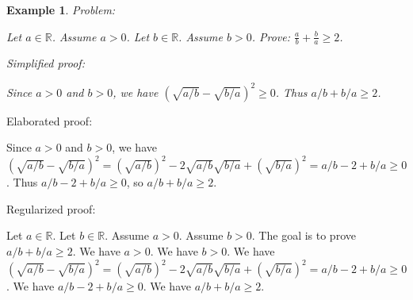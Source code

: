 \documentclass{article}
\newtheorem{example}{Example}
\begin{document}
\begin{tcolorbox}[colback=white!10, width=\linewidth]
\begin{lstlisting}[language=Lean4]
\end{lstlisting}
\end{tcolorbox}


\begin{example}
Problem:
\begin{tcolorbox}[colback=yellow!10, width=\linewidth]
Let $a\in\mathbb{R}$. Assume $a > 0$.
    Let $b\in\mathbb{R}$. Assume $b > 0$.
    Prove: $\frac{a}{b} + \frac{b}{a} \ge 2$.
\end{tcolorbox}

Simplified proof:
\begin{tcolorbox}[colback=blue!10, width=\linewidth]
Since $a>0$ and $b>0$, we have $(\sqrt{a/b} - \sqrt{b/a})^2 \ge 0$. Thus $a/b + b/a \ge 2$.
\end{tcolorbox}
\end{example}

Elaborated proof:
\begin{tcolorbox}[colback=green!10, width=\linewidth]
Since $a>0$ and $b>0$, we have $(\sqrt{a/b} - \sqrt{b/a})^2 = (\sqrt{a/b})^2 - 2\sqrt{a/b}\sqrt{b/a} + (\sqrt{b/a})^2 = a/b - 2 + b/a \ge 0$. Thus $a/b - 2 + b/a \ge 0$, so $a/b + b/a \ge 2$.
\end{tcolorbox}

Regularized proof:
\begin{tcolorbox}[colback=red!10, width=\linewidth]
Let $a\in\mathbb{R}$.
Let $b\in\mathbb{R}$.
Assume $a>0$.
Assume $b>0$.
The goal is to prove $a/b + b/a \ge 2$.
We have $a>0$.
We have $b>0$.
We have ${{(\sqrt{a/b} - \sqrt{b/a})}}^2 = {{(\sqrt{a/b})}}^2 - 2\sqrt{a/b}\sqrt{b/a} + {{(\sqrt{b/a})}}^2 = a/b - 2 + b/a \ge 0$.
We have $a/b - 2 + b/a \ge 0$.
We have $a/b + b/a \ge 2$.
\end{tcolorbox}
\end{document}
